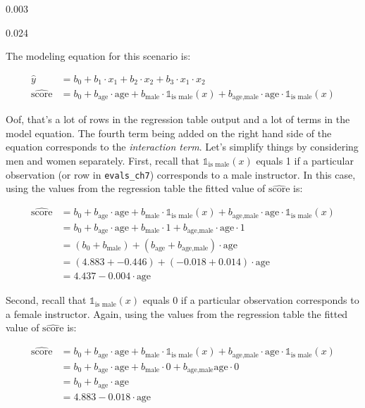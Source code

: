 \documentclass[12pt,]{krantz}
\begin{document}
0.003

0.024

The modeling equation for this scenario is:

\begin{align}
\widehat{y} &= b_0 + b_1 \cdot x_1 + b_2 \cdot x_2 + b_3 \cdot x_1 \cdot x_2\\
\widehat{\mbox{score}} &= b_0 + b_{\mbox{age}} \cdot \mbox{age} + b_{\mbox{male}} \cdot \mathbb{1}_{\mbox{is male}}(x) + b_{\mbox{age,male}} \cdot \mbox{age} \cdot \mathbb{1}_{\mbox{is male}}(x)
\end{align}

Oof, that's a lot of rows in the regression table output and a lot of
terms in the model equation. The fourth term being added on the right
hand side of the equation corresponds to the \emph{interaction term}.
Let's simplify things by considering men and women separately. First,
recall that \(\mathbb{1}_{\mbox{is male}}(x)\) equals 1 if a particular
observation (or row in \texttt{evals\_ch7}) corresponds to a male
instructor. In this case, using the values from the regression table the
fitted value of \(\widehat{\mbox{score}}\) is:

\begin{align}
\widehat{\mbox{score}} &= b_0 + b_{\mbox{age}} \cdot \mbox{age} + b_{\mbox{male}} \cdot \mathbb{1}_{\mbox{is male}}(x) + b_{\mbox{age,male}} \cdot \mbox{age} \cdot \mathbb{1}_{\mbox{is male}}(x) \\
&= b_0 + b_{\mbox{age}} \cdot \mbox{age} + b_{\mbox{male}} \cdot 1 + b_{\mbox{age,male}} \cdot \mbox{age} \cdot 1 \\
&= \left(b_0 + b_{\mbox{male}}\right) + \left(b_{\mbox{age}} +  b_{\mbox{age,male}} \right) \cdot \mbox{age} \\
&= \left(4.883 + -0.446\right) + \left(-0.018 +  0.014 \right) \cdot \mbox{age} \\
&= 4.437 -0.004 \cdot \mbox{age}
\end{align}

Second, recall that \(\mathbb{1}_{\mbox{is male}}(x)\) equals 0 if a
particular observation corresponds to a female instructor. Again, using
the values from the regression table the fitted value of
\(\widehat{\mbox{score}}\) is:

\begin{align}
\widehat{\mbox{score}} &= b_0 + b_{\mbox{age}} \cdot \mbox{age} + b_{\mbox{male}} \cdot \mathbb{1}_{\mbox{is male}}(x) + b_{\mbox{age,male}} \cdot \mbox{age} \cdot \mathbb{1}_{\mbox{is male}}(x) \\
&= b_0 + b_{\mbox{age}} \cdot \mbox{age} + b_{\mbox{male}} \cdot 0 + b_{\mbox{age,male}}\mbox{age} \cdot 0 \\
&= b_0 + b_{\mbox{age}} \cdot \mbox{age}\\
&= 4.883 -0.018 \cdot \mbox{age}
\end{align}
\end{document}
